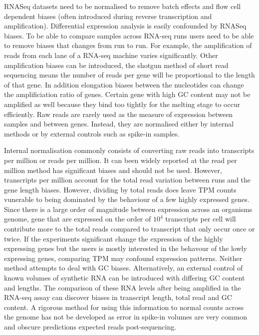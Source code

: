 \documentclass[../main.tex]{subfiles}
\begin{document}
RNASeq datasets need to be normalised to remove batch effects and flow cell dependent biases (often introduced during reverse transcription and amplification). 
Differential expression analysis is easily confounded by RNASeq biases.
To be able to compare samples across RNA-seq runs users need to be able to remove biases that changes from run to run. 
For example, the amplification of reads from each lane of a RNA-seq machine varies significantly. 
Other amplification biases can be introduced, the shotgun method of short read sequencing means the number of reads per gene will be proportional to the length of that gene. 
In addition elongation biases between the nucleotides can change the amplificiation ratio of genes.
Certain gene with high GC content may not be amplified as well because they bind too tightly for the melting stage to occur efficiently. 
Raw reads are rarely used as the measure of expression between samples and between genes. Instead, they are normalised either by internal methods or by external controls such as spike-in samples. 

Internal normalisation commonly consists of converting raw reads into transcripts per million or reads per million.
It can been widely reported at the read per million method has significant biases and should not be used. 
However, transcripts per million account for the total read variation between runs and the gene length biases. However, dividing by total reads does leave TPM counts vunerable to being dominated by the behaviour of a few highly expressed genes.
Since there is a large order of magnitude between expression across an organisms genome, gene that are expressed on the order of $10^4$ transcripts per cell will contribute more to the total reads compared to transcript that only occur once or twice. 
If the experiments significant change the expression of the highly expressing genes but the users is mostly interested in the behavour of the lowly expressing genes, comparing TPM may confound expression patterns. Neither method attempts to deal with GC biases. Alternatively, an external control of known volumes of synthetic RNA can be introduced with differing GC content and lengths. 
The comparison of these RNA levels after being amplified in the RNA-seq assay can discover biases in transcript length, total read and GC content.
A rigorous method for using this information to normal counts across the genome has not be developed as error in spike-in volumes are very common and obscure predictions expected reads post-sequencing.
\end{document}
